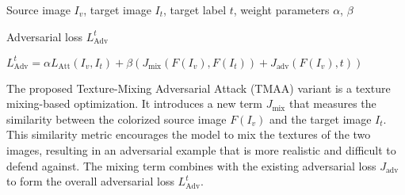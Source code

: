 Source image $I_v$, target image $I_t$, target label $t$, weight parameters $\alpha$, $\beta$

Adversarial loss $L_{\text{Adv}}^t$

$L_{\text{Adv}}^t = \alpha L_{\text{Att}}(I_v, I_t) + \beta (J_{\text{mix}} \left(F(I_v), F(I_t)\right) + J_{\text{adv}} \left(F(I_v), t \right))$

The proposed Texture-Mixing Adversarial Attack (TMAA) variant is a texture mixing-based optimization. It introduces a new term $J_{\text{mix}}$ that measures the similarity between the colorized source image $F(I_v)$ and the target image $I_t$. This similarity metric encourages the model to mix the textures of the two images, resulting in an adversarial example that is more realistic and difficult to defend against. The mixing term combines with the existing adversarial loss $J_{\text{adv}}$ to form the overall adversarial loss $L_{\text{Adv}}^t$.